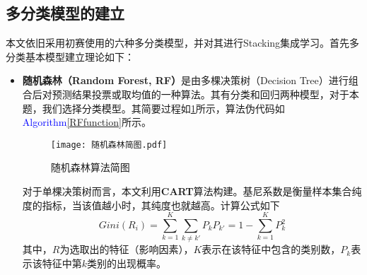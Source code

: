 \documentclass{MathorCupmodeling}
\begin{document}
	\subsection{多分类模型的建立}
	本文依旧采用初赛使用的六种多分类模型，并对其进行Stacking集成学习。首先多分类基本模型建立理论如下：
	\begin{itemize}
		\item \textbf{随机森林（Random Forest, RF）}是由多棵决策树（Decision Tree）进行组合后对预测结果投票或取均值的一种算法\textcolor{blue}{\cite{prf}}。其有分类和回归两种模型，对于本题，我们选择分类模型。其简要过程如\textcolor{blue}{\cref{fig:RF}}所示，算法伪代码如\textcolor{blue}{Algorithm\ref{RFfunction}}所示。
	
		\begin{figure}[H]
			\centerline{\texttt{[image: 随机森林简图.pdf]}}
			\caption{随机森林算法简图}\label{fig:RF}
		\end{figure}
		
		对于单棵决策树而言，本文利用\textbf{CART}算法\textcolor{blue}{\cite{prf}}构建。基尼系数是衡量样本集合纯度的指标，当该值越小时，其纯度也就越高。计算公式如下
		\begin{equation}
			Gini\left( R_i \right)=\sum\limits_{k=1}^{K}\sum\limits_{k\ne k'}P_k P_{k'}=1-\sum\limits_{k=1}^{K}P_k^2 \label{fGini}
		\end{equation}
		其中，$R$为选取出的特征（影响因素），$K$表示在该特征中包含的类别数，$P_k$表示该特征中第$k$类别的出现概率。
	

\end{itemize}
\end{document}
